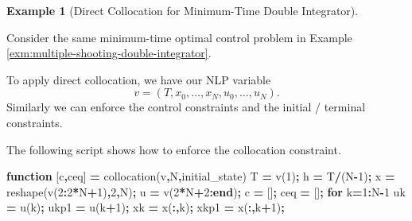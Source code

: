 \documentclass[
]{book}
\newenvironment{Shaded}{\begin{snugshade}}{\end{snugshade}}
\newcommand{\FloatTok}[1]{\textcolor[rgb]{0.00,0.00,0.81}{#1}}
\newcommand{\KeywordTok}[1]{\textcolor[rgb]{0.13,0.29,0.53}{\textbf{#1}}}
\newcommand{\NormalTok}[1]{#1}
\newcommand{\OperatorTok}[1]{\textcolor[rgb]{0.81,0.36,0.00}{\textbf{#1}}}
\newcommand{\VariableTok}[1]{\textcolor[rgb]{0.00,0.00,0.00}{#1}}
\theoremstyle{definition}
\theoremstyle{definition}
\newtheorem{example}{Example}[chapter]
\theoremstyle{definition}
\theoremstyle{definition}
\theoremstyle{remark}
\begin{document}
\begin{example}[Direct Collocation for Minimum-Time Double Integrator]
\protect\hypertarget{exm:collocation-double-integrator}{}\label{exm:collocation-double-integrator}

Consider the same minimum-time optimal control problem in Example \ref{exm:multiple-shooting-double-integrator}.

To apply direct collocation, we have our NLP variable
\[
v = (T,x_0,\dots,x_N,u_0,\dots,u_N).
\]
Similarly we can enforce the control constraints and the initial / terminal constraints.

The following script shows how to enforce the collocation constraint.

\begin{Shaded}
\begin{Highlighting}[]
\KeywordTok{function}\NormalTok{ [}\VariableTok{c}\OperatorTok{,}\VariableTok{ceq}\NormalTok{] }\OperatorTok{=} \VariableTok{collocation}\NormalTok{(}\VariableTok{v}\OperatorTok{,}\VariableTok{N}\OperatorTok{,}\VariableTok{initial\_state}\NormalTok{)}
\VariableTok{T} \OperatorTok{=} \VariableTok{v}\NormalTok{(}\FloatTok{1}\NormalTok{)}\OperatorTok{;}
\VariableTok{h} \OperatorTok{=} \VariableTok{T}\OperatorTok{/}\NormalTok{(}\VariableTok{N}\OperatorTok{{-}}\FloatTok{1}\NormalTok{)}\OperatorTok{;}
\VariableTok{x} \OperatorTok{=} \VariableTok{reshape}\NormalTok{(}\VariableTok{v}\NormalTok{(}\FloatTok{2}\OperatorTok{:}\FloatTok{2}\OperatorTok{*}\VariableTok{N}\OperatorTok{+}\FloatTok{1}\NormalTok{)}\OperatorTok{,}\FloatTok{2}\OperatorTok{,}\VariableTok{N}\NormalTok{)}\OperatorTok{;}
\VariableTok{u} \OperatorTok{=} \VariableTok{v}\NormalTok{(}\FloatTok{2}\OperatorTok{*}\VariableTok{N}\OperatorTok{+}\FloatTok{2}\OperatorTok{:}\KeywordTok{end}\NormalTok{)}\OperatorTok{;}
\VariableTok{c} \OperatorTok{=}\NormalTok{ []}\OperatorTok{;}
\VariableTok{ceq} \OperatorTok{=}\NormalTok{ []}\OperatorTok{;}
\KeywordTok{for} \VariableTok{k}\OperatorTok{=}\FloatTok{1}\OperatorTok{:}\VariableTok{N}\OperatorTok{{-}}\FloatTok{1}
    \VariableTok{uk} \OperatorTok{=} \VariableTok{u}\NormalTok{(}\VariableTok{k}\NormalTok{)}\OperatorTok{;}
    \VariableTok{ukp1} \OperatorTok{=} \VariableTok{u}\NormalTok{(}\VariableTok{k}\OperatorTok{+}\FloatTok{1}\NormalTok{)}\OperatorTok{;}
    \VariableTok{xk} \OperatorTok{=} \VariableTok{x}\NormalTok{(}\OperatorTok{:,}\VariableTok{k}\NormalTok{)}\OperatorTok{;}
    \VariableTok{xkp1} \OperatorTok{=} \VariableTok{x}\NormalTok{(}\OperatorTok{:,}\VariableTok{k}\OperatorTok{+}\FloatTok{1}\NormalTok{)}\OperatorTok{;}

\end{Highlighting}
\end{Shaded}
\end{example}
\end{document}
